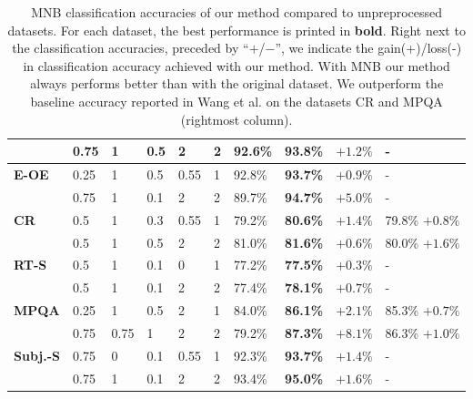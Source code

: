 \begin{table}
{\begin{tabular}{l|lllll|llll}
                 & 0.75 & 1        & 0.5     & 2        & 2       & 92.6\% & \textbf{93.8\%} & $+1.2\%$& -                                    \\\hline
\textbf{E-OE}    & 0.25 & 1        & 0.5     & 0.55     & 1       & 92.8\% & \textbf{93.7\%} & $+0.9\%$& -                                    \\
                 & 0.75 & 1        & 0.1     & 2        & 2       & 89.7\% & \textbf{94.7\%} & $+5.0\%$& -                                    \\\hline \hline
\textbf{CR}      & 0.5  & 1        & 0.3     & 0.55     & 1       & 79.2\% & \textbf{80.6\%} & $+1.4\%$& 79.8\% $+0.8\%$                              \\
                 & 0.5  & 1        & 0.5     & 2        & 2       & 81.0\% & \textbf{81.6\%} & $+0.6\%$& 80.0\% $+1.6\%$                     \\\hline
\textbf{RT-S}    & 0.5  & 1        & 0.1     & 0        & 1       & 77.2\% & \textbf{77.5\%} & $+0.3\%$& -                                    \\
                 & 0.5  & 1        & 0.1     & 2        & 2       & 77.4\% & \textbf{78.1\%} & $+0.7\%$& -                                    \\\hline
\textbf{MPQA}    & 0.25 & 1        & 0.5     & 2        & 1       & 84.0\% & \textbf{86.1\%} & $+2.1\%$& 85.3\% $+0.7\%$                     \\
                 & 0.75 & 0.75     & 1       & 2        & 2       & 79.2\% & \textbf{87.3\%} & $+8.1\%$& 86.3\% $+1.0\%$                     \\\hline
\textbf{Subj.-S} & 0.75 & 0        & 0.1     & 0.55     & 1       & 92.3\% & \textbf{93.7\%} & $+1.4\%$& -                                    \\
                 & 0.75 & 1        & 0.1     & 2        & 2       & 93.4\% & \textbf{95.0\%} & $+1.6\%$& -                                    \\\hline
\end{tabular}
}
\caption{MNB classification accuracies of our method compared to unpreprocessed datasets. 
For each dataset, the best performance is printed in \textbf{bold}. 
Right next to the classification accuracies, preceded by ``$+$/$-$'', we indicate the gain(+)/loss(-) in classification accuracy 
achieved with our method. With MNB our method always performs better than with the original dataset.
We outperform the baseline accuracy reported in Wang et al. \cite{wang2012baselines} on the datasets CR and MPQA (rightmost column).}
\label{tbl:results-10-fold-MNB-acc}
\end{table}

